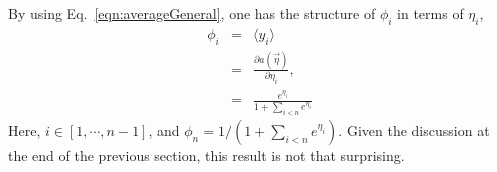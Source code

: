 By using Eq.~\ref{eqn:averageGeneral}, one has the structure of $\phi_i$ in terms of $\eta_i$,
\begin{eqnarray}
\phi_i &=&\langle y_i\rangle\\
       &=&\frac{\partial a(\vec\eta)}{\partial\eta_i},\\
       &=&\frac{e^{\eta_i}}{1+\sum_{i<n}e^{\eta_i}}
\end{eqnarray}
Here, $i\in[1,\cdots,n-1]$, and $\phi_n=1/(1+\sum_{i<n}e^{\eta_i})$. Given the discussion at the end of the previous section, this result is not that surprising.

